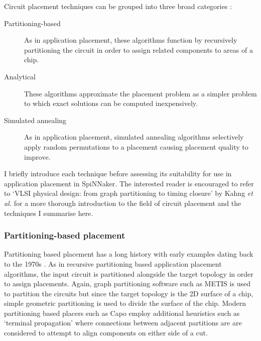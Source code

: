 			Circuit placement techniques can be grouped into three broad categories
			\cite{kahng11}:
			
			\begin{description}
				
				\item[Partitioning-based] As in application placement, these algorithms
				function by recursively partitioning the circuit in order to assign
				related components to areas of a chip.
				
				\item[Analytical] These algorithms approximate the placement problem as
				a simpler problem to which exact solutions can be computed
				inexpensively.
				
				\item[Simulated annealing] As in application placement, simulated
				annealing algorithms selectively apply random permutations to a
				placement causing placement quality to improve.
				
			\end{description}
			
			I briefly introduce each technique before assessing its suitability for
			use in application placement in SpiNNaker. The interested reader is
			encouraged to refer to `VLSI physical design: from graph partitioning to
			timing closure' by Kahng \emph{et al.} \cite{kahng11} for a more thorough
			introduction to the field of circuit placement and the techniques I
			summarise here.
			
			\subsubsection{Partitioning-based placement}
				
				Partitioning based placement has a long history with early examples
				dating back to the 1970s \cite{breuer77}. As in recursive partitioning
				based application placement algorithms, the input circuit is
				partitioned alongside the target topology in order to assign
				placements. Again, graph partitioning software such as METIS
				\cite{karypis98} is used to partition the circuits but since the target
				topology is the 2D surface of a chip, simple geometric partitioning is
				used to divide the surface of the chip. Modern partitioning based
				placers such as Capo \cite{roy05} employ additional heuristics such as
				`terminal propagation' where connections between adjacent partitions
				are are considered to attempt to align components on either side of a
				cut.
				
